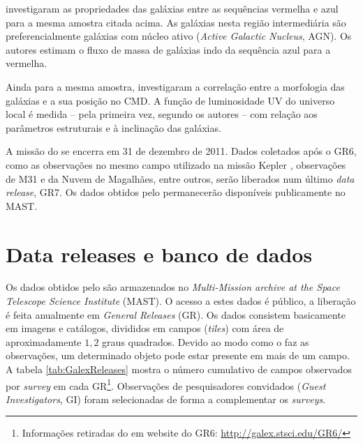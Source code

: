 \citet{Martin2007} investigaram as propriedades das galáxias entre as sequências
vermelha e azul para a mesma amostra citada acima. As galáxias nesta região
intermediária são preferencialmente galáxias com núcleo ativo ({\em Active
Galactic Nucleus}, AGN). Os autores estimam o fluxo de massa de galáxias indo da
sequência azul para a vermelha.

Ainda para a mesma amostra, \citet{Schiminovich2007} investigaram a correlação
entre a morfologia das galáxias e a sua posição no CMD. A função de luminosidade
UV do universo local é medida -- pela primeira vez, segundo os autores -- com
relação aos parâmetros estruturais e à inclinação das galáxias.

A missão do \galex se encerra em 31 de dezembro de 2011. Dados coletados após o
GR6, como as observações no mesmo campo utilizado na missão Kepler
\citep{KeplerMission}, observações de M31 e da Nuvem de Magalhães, entre outros,
serão liberados num último {\em data release}, GR7. Os dados obtidos pelo \galex
permanecerão disponíveis publicamente no MAST.




\section{Data releases e banco de dados}
\label{sec:Galex:BancoDeDados}

Os dados obtidos pelo \galex são armazenados no {\em Multi-Mission archive at
the Space Telescope Science Institute} (MAST). O acesso a estes dados é público,
a liberação é feita anualmente em {\em General Releases} (GR). Os dados
consistem basicamente em imagens e catálogos, divididos em campos ({\em tiles})
com área de aproximadamente $1,2$ graus quadrados. Devido ao modo como o \galex
faz as observações, um determinado objeto pode estar presente em mais de um
campo. A tabela \ref{tab:GalexReleases} mostra o número cumulativo de campos
observados por {\em survey} em cada GR\footnote{Informações retiradas do {em
website} do GR6: \url{http://galex.stsci.edu/GR6/}}. Observações de
pesquisadores convidados ({\em Guest Investigators}, GI) foram selecionadas de
forma a complementar os {\em surveys}.

